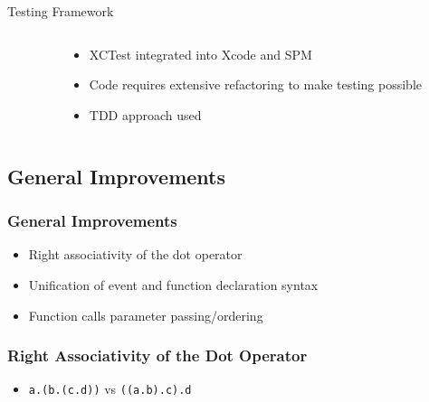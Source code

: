 \documentclass[aspectratio=169]{beamer}
\begin{document}
\begin{frame}{Testing Framework}
\begin{columns}
    \begin{column}{0.5\textwidth}
        \inputminted[fontsize=\tiny]{swift}{code/unit-test.flint}
    \end{column}
    \begin{column}{0.5\textwidth}
        \begin{itemize}
            \item XCTest integrated into Xcode and SPM
            \item Code requires extensive refactoring to make testing possible
            \item TDD approach used
        \end{itemize}
    \end{column}
\end{columns}
\end{frame}

\subsection{General Improvements}
\begin{frame}
\frametitle{General Improvements}
\begin{itemize}
    \item Right associativity of the dot operator
    \item Unification of event and function declaration syntax
    \item Function calls parameter passing/ordering
\end{itemize}
\end{frame}

\begin{frame}
\frametitle{Right Associativity of the Dot Operator}
\begin{itemize}
    \item \texttt{a.(b.(c.d))} vs \texttt{((a.b).c).d}
\end{itemize}
\end{frame}
\end{document}
